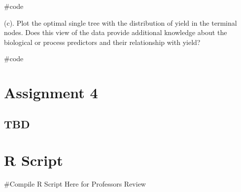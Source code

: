 \documentclass[openany]{report}
\newenvironment{Shaded}{\begin{snugshade}}{\end{snugshade}}
\newcommand{\CommentTok}[1]{\textcolor[rgb]{0.50,0.62,0.50}{#1}}
\begin{document}
\begin{Shaded}
\begin{Highlighting}[]
\CommentTok{#code}
\end{Highlighting}
\end{Shaded}

\begin{subquestion}{(c).} Plot the optimal single tree with the distribution of yield in the terminal nodes. Does this view of the data provide additional knowledge about the biological or process predictors and their relationship with yield?\end{subquestion}

\begin{Shaded}
\begin{Highlighting}[]
\CommentTok{#code}
\end{Highlighting}
\end{Shaded}

\hypertarget{AS-4}{%
\chapter*{Assignment 4}\label{AS-4}}

\hypertarget{tbd}{%
\section{TBD}\label{tbd}}

\hypertarget{R-Script}{%
\chapter*{R Script}\label{R-Script}}

\begin{Shaded}
\begin{Highlighting}[]
\CommentTok{#Compile R Script Here for Professors Review}
\end{Highlighting}
\end{Shaded}
\end{document}

